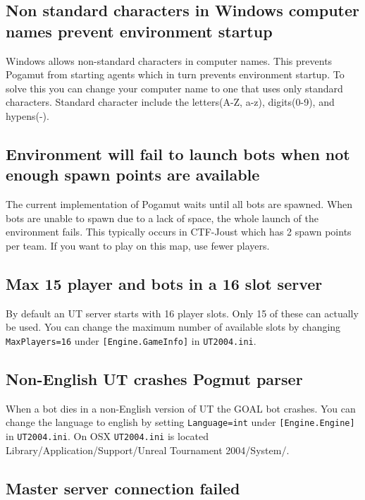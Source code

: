 \documentclass[11pt,a4paper]{article}
\begin{document}
\subsection{Non standard characters in Windows computer names prevent environment startup}

Windows allows non-standard characters in computer names. This prevents Pogamut from starting agents which in turn prevents environment startup. To solve this you can change your computer name to one that uses only standard characters. Standard character include the letters(A-Z, a-z), digits(0-9), and hypens(-).

\subsection{Environment will fail to launch bots when not enough spawn points are available}

The current implementation of Pogamut waits until all bots are spawned. When bots are unable to spawn due to a lack of space, the whole launch of the environment fails. This typically occurs in CTF-Joust which has 2 spawn points per team. If you want to play on this map, use fewer players.

\subsection{Max 15 player and bots in a 16 slot server}

By default an UT server starts with 16 player slots. Only 15 of these can actually be used. You can change the maximum number of available slots by changing \verb|MaxPlayers=16| under \verb|[Engine.GameInfo]| in \verb|UT2004.ini|.

\subsection{Non-English UT crashes Pogmut parser}

When a bot dies in a non-English version of UT the GOAL bot crashes. You can change the language to english by setting \verb|Language=int| under \verb|[Engine.Engine]| in \verb|UT2004.ini|. On OSX \verb|UT2004.ini| is located Library/Application/Support/Unreal Tournament 2004/System/.

\subsection{Master server connection failed}
\end{document}
